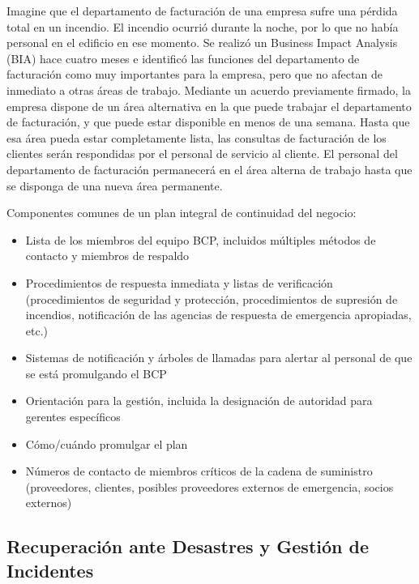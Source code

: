 \begin{tcolorbox}[colback=gray!5!white,colframe=orange!60!gray,title=Caso]Imagine que el departamento de facturación de una empresa sufre una pérdida total en un incendio. El incendio ocurrió durante la noche, por lo que no había personal en el edificio en ese momento. Se realizó un Business Impact Analysis (BIA) hace cuatro meses e identificó las funciones del departamento de facturación como muy importantes para la empresa, pero que no afectan de inmediato a otras áreas de trabajo. Mediante un acuerdo previamente firmado, la empresa dispone de un área alternativa en la que puede trabajar el departamento de facturación, y que puede estar disponible en menos de una semana. Hasta que esa área pueda estar completamente lista, las consultas de facturación de los clientes serán respondidas por el personal de servicio al cliente. El personal del departamento de facturación permanecerá en el área alterna de trabajo hasta que se disponga de una nueva área permanente.
\end{tcolorbox}


Componentes comunes de un plan integral de continuidad del negocio:
\begin{itemize}
    \item Lista de los miembros del equipo BCP, incluidos múltiples métodos de contacto y miembros de respaldo
    \item Procedimientos de respuesta inmediata y listas de verificación (procedimientos de seguridad y protección, procedimientos de supresión de incendios, notificación de las agencias de respuesta de emergencia apropiadas, etc.)
    \item Sistemas de notificación y árboles de llamadas para alertar al personal de que se está promulgando el BCP
    \item Orientación para la gestión, incluida la designación de autoridad para gerentes específicos
    \item Cómo/cuándo promulgar el plan
    \item Números de contacto de miembros críticos de la cadena de suministro (proveedores, clientes, posibles proveedores externos de emergencia, socios externos)


\end{itemize}

\subsection{Recuperación ante Desastres y Gestión de Incidentes}


